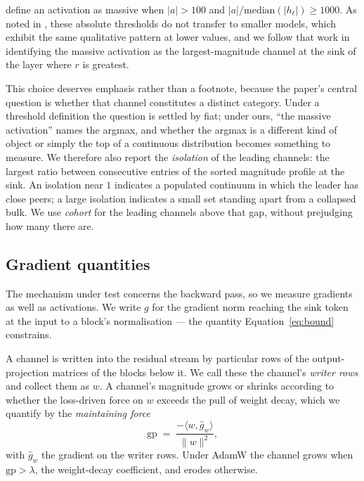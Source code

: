 \documentclass[11pt]{article}
\begin{document}
\citet{sun2024massive} define an activation as massive when $|a| > 100$ and
$|a|/\mathrm{median}(|h_\ell|)\ge 1000$. As noted in \citet{gallego2025hidden},
these absolute thresholds do not transfer to smaller models, which exhibit the same
qualitative pattern at lower values, and we follow that work in identifying the
massive activation as the largest-magnitude channel at the sink of the layer where
$r$ is greatest.

This choice deserves emphasis rather than a footnote, because the paper's central
question is whether that channel constitutes a distinct category. Under a threshold
definition the question is settled by fiat; under ours, ``the massive activation''
names the argmax, and whether the argmax is a different kind of object or simply the
top of a continuous distribution becomes something to measure. We therefore also
report the \emph{isolation} of the leading channels: the largest ratio between
consecutive entries of the sorted magnitude profile at the sink. An isolation near
$1$ indicates a populated continuum in which the leader has close peers; a large
isolation indicates a small set standing apart from a collapsed bulk. We use
\emph{cohort} for the leading channels above that gap, without prejudging how many
there are.

\subsection{Gradient quantities}

The mechanism under test concerns the backward pass, so we measure gradients as well
as activations. We write $g$ for the gradient norm reaching the sink token at the
input to a block's normalisation --- the quantity Equation~\eqref{eq:bound}
constrains.

A channel is written into the residual stream by particular rows of the
output-projection matrices of the blocks below it. We call these the channel's
\emph{writer rows} and collect them as $w$. A channel's magnitude grows or shrinks
according to whether the loss-driven force on $w$ exceeds the pull of weight decay,
which we quantify by the \emph{maintaining force}
\begin{equation}\label{eq:maintain}
\mathrm{gp} \;=\; \frac{-\langle w,\hat g_w\rangle}{\lVert w\rVert^2},
\end{equation}
with $\hat g_w$ the gradient on the writer rows. Under AdamW the channel grows when
$\mathrm{gp} > \lambda$, the weight-decay coefficient, and erodes otherwise.
\end{document}
